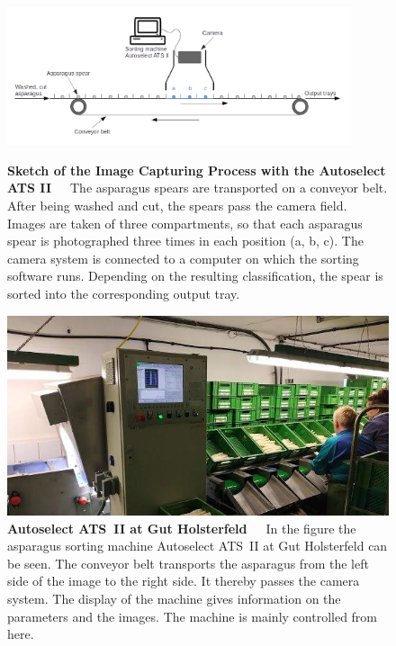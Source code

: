 \begin{figure}[!t]
	\centering
	\includegraphics[width=0.9\textwidth]{Figures/chapter02/asparagusconveyerbelt_new.png}
	\decoRule
	\caption[Sketch of the Image Capturing Process with the Autoselect ATS II]{\textbf{Sketch of the Image Capturing Process with the Autoselect ATS II}~~~The asparagus spears are transported on a conveyor belt. After being washed and cut, the spears pass the camera field. Images are taken of three compartments, so that each asparagus spear is photographed three times in each position (a, b, c). The camera system is connected to a computer on which the sorting software runs. Depending on the resulting classification, the spear is sorted into the corresponding output tray.}
	\label{fig:SortingMachineSketch}
	\vspace{15pt}
	\centering
	\includegraphics[scale=0.6]{Figures/chapter02/sortingmachine_front.png}
	\decoRule
	\caption[The Autoselect ATS II at Gut Holsterfeld]{\textbf{Autoselect ATS~II at Gut Holsterfeld}~~~In the figure the asparagus sorting machine Autoselect ATS~II at Gut Holsterfeld can be seen. The conveyor belt transports the asparagus from the left side of the image to the right side. It thereby passes the camera system. The display of the machine gives information on the parameters and the images. The machine is mainly controlled from here.}
	\label{fig:SortingMachine}
\end{figure}

